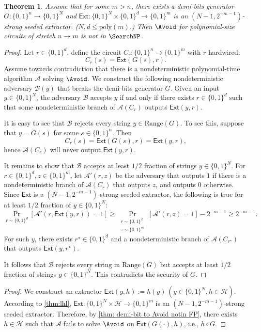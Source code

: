 \documentclass[10pt,a4paper]{article}
\newtheorem{theorem}{Theorem}[section]
\theoremstyle{definition}
\theoremstyle{remark}
\renewcommand{\poly}{\mathrm{poly}}
\newcommand{\Ext}{\mathsf{Ext}}
\newcommand{\calA}{\mathcal{A}}
\newcommand{\calB}{\mathcal{B}}
\newcommand{\calH}{\mathcal{H}}
\newcommand{\Range}{\mathrm{Range}}
\begin{document}
\begin{theorem}\label{thm: demi-bit to Avoid notin FP}
	Assume that for some $m > n$, there exists a demi-bits generator $G: \{0, 1\}^n \to \{0, 1\}^N$ and $\Ext: \{0, 1\}^N \times \{0, 1\}^d \to \{0, 1\}^m$ is an $(N-1, 2^{-m-1})$-strong seeded extractor. ($N,d\leq\poly(m)$.) Then $\Avoid$ for polynomial-size circuits of stretch $n\to m$ is not in $\SearchNP$.  %
\end{theorem}
\begin{proof}
	Let $r \in \{0, 1\}^d$, define the circuit $C_r: \{0, 1\}^n \to \{0, 1\}^m$ with $r$ hardwired:
	\[C_r(s) = \Ext(G(s), r).\]
	Assume towards contradiction that there is a nondeterministic polynomial-time algorithm $\calA$ solving $\Avoid$. We construct the following nondeterministic adversary $\calB(y)$ that breaks the demi-bits generator $G$. Given an input $y \in \{0, 1\}^N$, the adversary $\calB$ accepts $y$ if and only if there exists $r \in \{0, 1\}^d$ such that some nondeterministic branch of $\calA(C_r)$ outputs $\Ext(y, r)$.

	It is easy to see that $\calB$ rejects every string $y\in\Range(G)$. To see this, suppose that $y = G(s)$ for some $s \in \{0, 1\}^n$. Then
	\[C_r(s) = \Ext(G(s), r) = \Ext(y, r),\]
	hence $\calA(C_r)$ will never output $\Ext(y, r)$.

	It remains to show that $\calB$ accepts at least $1/2$ fraction of strings $y \in \{0, 1\}^N$. For $r\in \{0, 1\}^d, z\in\{0, 1\}^m$, let $\calA'(r, z)$ be the adversary that outputs $1$ if there is a nondeterministic branch of $\calA(C_r)$ that outputs $z$, and outputs $0$ otherwise. Since $\Ext$ is a $(N-1, 2^{-m-1})$-strong seeded extractor, %
    the following is true for at least $1/2$ fraction of $y \in \{0, 1\}^N$:
	\[\Pr_{r\sim \{0, 1\}^d}[\calA'(r, \Ext(y, r)) = 1] \ge \Pr_{\substack{r\sim \{0, 1\}^d\\z\sim \{0, 1\}^m}}[\calA'(r, z) = 1] - 2^{-m-1} \ge 2^{-m-1}.\]
	For such $y$, there exists $r^\star\in \{0, 1\}^d$ and a nondeterministic branch of $\calA(C_{r^\star})$ that outputs $\Ext(y, r^\star)$.
	
	It follows that $\calB$ rejects every string in $\Range(G)$ but accepts at least $1/2$ fraction of strings $y\in \{0, 1\}^N$. This contradicts the security of $G$.
\end{proof}


\ThmDemiBitsPlusHash*
\begin{proof}
    We construct an extractor
    \(\Ext(y,h):=h(y)~(y\in\{0,1\}^N,h\in\calH)\). 
    According to \autoref{thm:lhl}, $\Ext\colon\{0,1\}^N\times\calH\to\{0,1\}^m$ is an $(N-1,2^{-m-1})$-strong seeded extractor. Therefore, by \autoref{thm: demi-bit to Avoid notin FP}, there exists $h\in\calH$ such that $\calA$ fails to solve $\Avoid$ on $\Ext(G(\cdot),h)$, i.e., $h\circ G$.
\end{proof}
\end{document}

